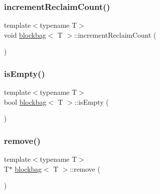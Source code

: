 \mbox{\label{classblockbag_a660dcb368b89a1d6a96cf7d9bc0bf11d}} 
\subsubsection{\texorpdfstring{increment\+Reclaim\+Count()}{incrementReclaimCount()}}
{\footnotesize\ttfamily template$<$typename T$>$ \\
void \hyperlink{classblockbag}{blockbag}$<$ T $>$\+::increment\+Reclaim\+Count (\begin{DoxyParamCaption}{ }\end{DoxyParamCaption})\hspace{0.3cm}{\ttfamily [inline]}}

\mbox{\label{classblockbag_a376e7a8a4f8a2a4d0670504b4e8de0ba}} 
\subsubsection{\texorpdfstring{is\+Empty()}{isEmpty()}}
{\footnotesize\ttfamily template$<$typename T$>$ \\
bool \hyperlink{classblockbag}{blockbag}$<$ T $>$\+::is\+Empty (\begin{DoxyParamCaption}{ }\end{DoxyParamCaption})\hspace{0.3cm}{\ttfamily [inline]}}

\mbox{\label{classblockbag_a673f44a045b3b89c1ce9360d20e6037a}} 
\subsubsection{\texorpdfstring{remove()}{remove()}\hspace{0.1cm}{\footnotesize\ttfamily [1/2]}}
{\footnotesize\ttfamily template$<$typename T$>$ \\
T$\ast$ \hyperlink{classblockbag}{blockbag}$<$ T $>$\+::remove (\begin{DoxyParamCaption}{ }\end{DoxyParamCaption})\hspace{0.3cm}{\ttfamily [inline]}}

